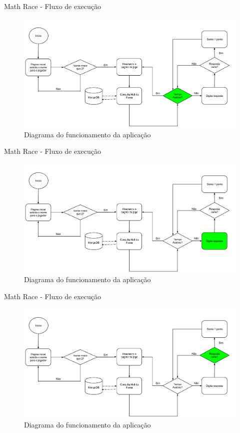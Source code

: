 \documentclass{beamer}
\begin{document}
\begin{frame}{Math Race - Fluxo de execução}
    \begin{figure}[htb]
    \centering
    \includegraphics[scale=0.2]{../images/func_mr_s6.png}
    \caption{Diagrama do funcionamento da aplicação}
    \label{fig: func_mr6}
    \end{figure}
\end{frame}
\begin{frame}{Math Race - Fluxo de execução}
    \begin{figure}[htb]
    \centering
    \includegraphics[scale=0.2]{../images/func_mr_s7.png}
    \caption{Diagrama do funcionamento da aplicação}
    \label{fig: func_mr7}
    \end{figure}
\end{frame}
\begin{frame}{Math Race - Fluxo de execução}
    \begin{figure}[htb]
    \centering
    \includegraphics[scale=0.2]{../images/func_mr_s8.png}
    \caption{Diagrama do funcionamento da aplicação}
    \label{fig: func_mr8}
    \end{figure}
\end{frame}
\end{document}
